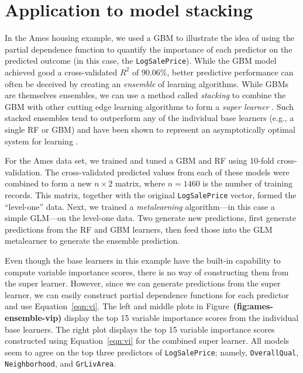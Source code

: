 \documentclass[12pt]{article}
\def\code#1{\texttt{#1}}
\def\ref#1{\textbf{(#1)}}
\begin{document}
\section{Application to model stacking}
\label{sec:ensemble}

In the Ames housing example, we used a GBM to illustrate the idea of using the partial dependence function to quantify the importance of each predictor on the predicted outcome (in this case, the \code{LogSalePrice}). While the GBM model achieved good a cross-validated $R^2$ of $90.06$\%, better predictive performance can often be deceived by creating an \textit{ensemble} of learning algorithms. While GBMs are themselves ensembles, we can use a method called \textit{stacking} to combine the GBM with other  cutting edge learning algorithms to form a \textit{super learner} \citep{stacked-wolpert-1992}. Such stacked ensembles tend to outperform any of the individual base learners (e.g., a single RF or GBM) and have been shown to represent an asymptotically optimal system for learning \citep{super-laan-2003}.

For the Ames data set, we trained and tuned a GBM and RF using 10-fold cross-validation. The cross-validated predicted values from each of these models were combined to form a new $n \times 2$ matrix, where $n = 1460$ is the number of training records. This matrix, together with the original \code{LogSalePrice} vector, formed the ``level-one'' data. Next, we trained a \textit{metalearning} algorithm---in this case a simple GLM---on the level-one data. Two generate new predictions, first generate predictions from the RF and GBM learners, then feed those into the GLM metalearner to generate the ensemble prediction. 

Even though the base learners in this example have the built-in capability to compute variable importance scores, there is no way of constructing them from the super learner. However, since we can generate predictions from the super learner, we can easily construct partial dependence functions for each predictor and use Equation~\eqref{eqn:vi}. The left and middle plots in Figure~\ref{fig:ames-ensemble-vip} display the top 15 variable importance scores from the individual base learners. The right plot displays the top 15 variable importance scores constructed using Equation~\eqref{eqn:vi} for the combined super learner. All models seem to agree on the top three predictors of \code{LogSalePrice}; namely, \code{OverallQual}, \code{Neighborhood}, and \code{GrLivArea}. 
\end{document}
